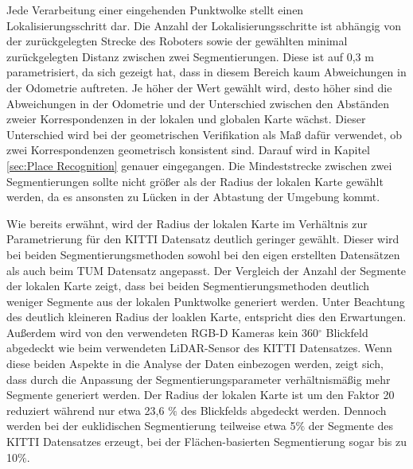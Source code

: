 Jede Verarbeitung einer eingehenden Punktwolke stellt einen Lokalisierungsschritt dar. Die Anzahl der Lokalisierungsschritte ist abhängig von der zurückgelegten Strecke des Roboters sowie der gewählten minimal zurückgelegten Distanz zwischen zwei Segmentierungen. Diese ist auf 0,3 m parametrisiert, da sich gezeigt hat, dass in diesem Bereich kaum Abweichungen in der Odometrie auftreten. Je höher der Wert gewählt wird, desto höher sind die Abweichungen in der Odometrie und der Unterschied zwischen den Abständen zweier Korrespondenzen in der lokalen und globalen Karte wächst. Dieser Unterschied wird bei der geometrischen Verifikation als Maß dafür verwendet, ob zwei Korrespondenzen geometrisch konsistent sind. Darauf wird in Kapitel \ref{sec:Place Recognition} genauer eingegangen. Die Mindeststrecke zwischen zwei Segmentierungen sollte nicht größer als der Radius der lokalen Karte gewählt werden, da es ansonsten zu Lücken in der Abtastung der Umgebung kommt.  

Wie bereits erwähnt, wird der Radius der lokalen Karte im Verhältnis zur Parametrierung für den KITTI Datensatz deutlich geringer gewählt. Dieser wird bei beiden  Segmentierungsmethoden sowohl bei den eigen erstellten Datensätzen als auch beim TUM Datensatz angepasst. Der Vergleich der Anzahl der Segmente der lokalen Karte zeigt, dass bei beiden Segmentierungsmethoden deutlich weniger Segmente aus der lokalen Punktwolke  generiert werden. Unter Beachtung des deutlich kleineren Radius der loaklen Karte, entspricht dies den Erwartungen. Außerdem wird von den verwendeten RGB-D Kameras kein 360$ ^\circ $ Blickfeld abgedeckt wie beim verwendeten LiDAR-Sensor des KITTI Datensatzes. Wenn diese beiden Aspekte in die Analyse der Daten einbezogen werden, zeigt sich, dass durch die Anpassung der Segmentierungsparameter verhältnismäßig mehr Segmente generiert werden. Der Radius der lokalen Karte ist um den Faktor 20 reduziert während nur etwa 23,6 $\%$ des Blickfelds abgedeckt werden. Dennoch werden bei der euklidischen Segmentierung teilweise etwa 5$\%$ der Segmente des KITTI Datensatzes erzeugt, bei der Flächen-basierten Segmentierung sogar bis zu 10$\%$.

 
